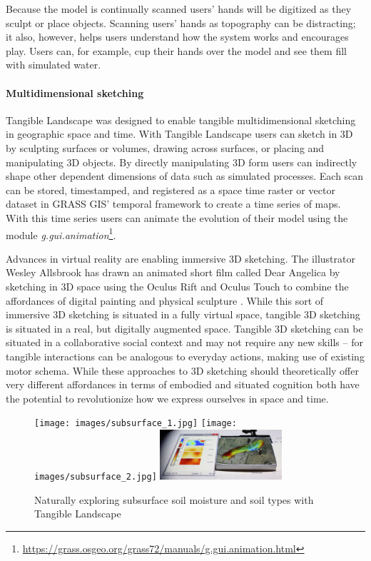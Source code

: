 \documentclass[prodmode,acmtochi]{acmsmall} %
\begin{document}
Because the model is continually scanned
users' hands will be digitized as they sculpt or place objects. 
Scanning users' hands as topography can be distracting; 
it also, however, helps users understand how the system works
and encourages play. 
Users can, for example, cup their hands over the model 
and see them fill with simulated water. 

\paragraph{Multidimensional sketching}
%
Tangible Landscape was designed to enable tangible multidimensional sketching
in geographic space and time. 
%
With Tangible Landscape users can sketch in 3D
by sculpting surfaces or volumes,
drawing across surfaces, 
or placing and manipulating 3D objects.
%
By directly manipulating 3D form 
users can indirectly shape other dependent dimensions of data 
such as simulated processes. 
%
Each scan can be stored, timestamped, and registered
as a space time raster or vector dataset %
in GRASS GIS' temporal framework
to create a time series of maps. 
%
With this time series users can animate the evolution of their model using the module 
\emph{g.gui.animation}\footnote{\url{https://grass.osgeo.org/grass72/manuals/g.gui.animation.html}}.

Advances in virtual reality are enabling immersive 3D sketching.
%
The illustrator
Wesley Allsbrook %
has drawn an animated short film called Dear Angelica
by sketching in 3D space using the Oculus Rift and Oculus Touch
to combine the affordances of digital painting and physical sculpture \cite{Oculus2016,Quilez2016}. 
%
While this sort of immersive 3D sketching is situated in a fully virtual space,
tangible 3D sketching is situated in a real, but digitally augmented space. 
%
Tangible 3D sketching
can be situated in a collaborative social context
and may not require any new skills -- 
for tangible interactions 
can be analogous to everyday actions, 
making use of existing motor schema.
%
While these approaches to 3D sketching 
should theoretically offer very different affordances
in terms of embodied and situated cognition
both have the potential to revolutionize how we 
express ourselves in space and time.

\begin{figure}
\begin{center}
		\texttt{[image: images/subsurface\_1.jpg]}
		\texttt{[image: images/subsurface\_2.jpg]}
		\includegraphics[height=70px]{images/subsurface_3.jpg}
	\caption{Naturally exploring subsurface soil moisture and soil types with Tangible Landscape}
	\label{fig:subsurface}
\end{center}
\end{figure}
\end{document}
